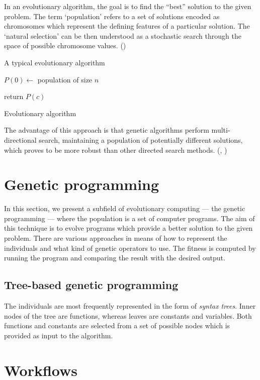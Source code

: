 In an evolutionary algorithm, the goal is to find the ``best'' solution to the given problem. The term `population' refers to a set of solutions encoded as chromosomes which represent the defining features of a particular solution. The `natural selection' can be then understood as a stochastic search through the space of possible chromosome values. (\cite{Engelbrecht:2007:CII:1557464}) %

A typical evolutionary algorithm

\begin{algorithm}
\DontPrintSemicolon
  \;
  $P(0) \longleftarrow$ population of size $n$

  \;
  return $P(c)$  
\caption{Evolutionary algorithm\label{EA}}
\end{algorithm}

The advantage of this approach is that genetic algorithms perform multi-directional search, maintaining a population of potentially different solutions, which proves to be more robust than other directed search methods. (\cite{Michalewicz:1996:GAD:229930}, \cite{Mitchell:1997:ML:541177}) %

\section{Genetic programming}
In this section, we present a subfield of evolutionary computing --- the genetic programming --- where the population is a set of computer programs. The aim of this technique is to evolve programs which provide a better solution to the given problem. There are various approaches in means of how to represent the individuals and what kind of genetic operators to use. The fitness is computed by running the program and comparing the result with the desired output. \cite{Poli:2008:FGG:1796422}
\subsection{Tree-based genetic programming}
The individuals are most frequently represented in the form of \textit{syntax trees}. Inner nodes of the tree are functions, whereas leaves are constants and variables. Both functions and constants are selected from a set of possible nodes which is provided as input to the algorithm.


\section{Workflows}